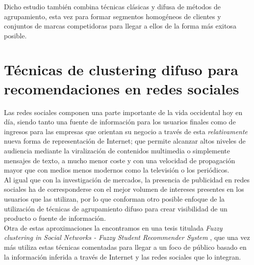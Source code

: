 \documentclass[]{report}
\begin{document}
			Dicho estudio también combina técnicas clásicas y difusa de métodos de agrupamiento, esta vez para formar segmentos homogéneos de clientes y conjuntos de marcas competidoras para llegar a ellos de la forma más exitosa posible.
			
		\section{Técnicas de clustering difuso para recomendaciones en redes sociales}
		
			Las redes sociales componen una parte importante de la vida occidental hoy en día, siendo tanto una fuente de información para los usuarios finales como de ingresos para las empresas que orientan su negocio a través de esta \textit{relativamente} nueva forma de representación de Internet; que permite alcanzar altos niveles de audiencia mediante la viralización de contenidos multimedia o simplemente mensajes de texto, a mucho menor coste y con una velocidad de propagación mayor que con medios menos modernos como la televisión o los periódicos.\\
			
			Al igual que con la investigación de mercados, la presencia de publicidad en redes sociales ha de corresponderse con el mejor volumen de intereses presentes en los usuarios que las utilizan, por lo que conforman otro posible enfoque de la utilización de técnicas de agrupamiento difuso para crear visibilidad de un producto o fuente de información.\\
			
			Otra de estas aproximaciones la encontramos en una tesis titulada \textit{Fuzzy clustering in Social Networks - Fuzzy Student Recommender System} \cite{recommendation}, que una vez más utiliza estas técnicas comentadas para llegar a un foco de público basado en la información inferida a través de Internet y las redes sociales que lo integran.
			


\end{document}
